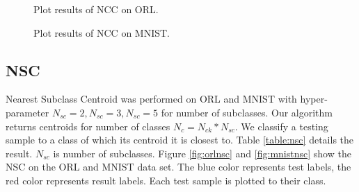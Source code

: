 \documentclass[journal]{IEEEtran}
\begin{document}
\begin{figure}[H]
	\centering
	\caption{Plot results of NCC on ORL.}
	\label{fig:orlnc}
\end{figure}


\begin{figure}[H]
	\centering
	\caption{Plot results of NCC on MNIST.}
	\label{fig:mnistnc}
\end{figure}

\subsection{NSC}

Nearest Subclass Centroid was performed on ORL and MNIST with hyper-parameter $N_{sc}=2, N_{sc}=3, N_{sc}=5$ for number of subclasses. Our algorithm returns centroids for number of classes $N_{c}=N_{ck}*N_{sc}$. We classify a testing sample to a class of which its centroid it is closest to. Table \ref{table:nsc} details the result. $N_{sc}$ is number of subclasses. Figure \ref{fig:orlnsc} and \ref{fig:mnistnsc} show the NSC on the ORL and MNIST data set. The blue color represents test labels, the red color represents result labels. Each test sample is plotted to their class.
\end{document}
